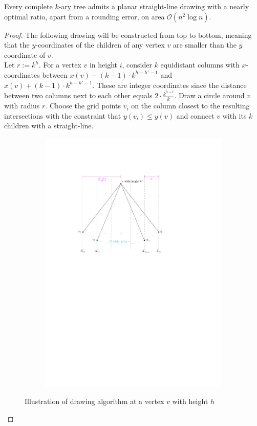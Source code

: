 
\begin{theorem}
	Every complete $k$-ary tree admits a planar straight-line drawing with a nearly optimal ratio, apart from a rounding error, on area $\mathcal{O}(n^2\log n)$.
\end{theorem}
\begin{proof}
	The following drawing will be constructed from top to bottom, meaning that the $y$-coordinates of the children of any vertex $v$ are smaller than the $y$ coordinate of $v$.\\
	Let $r := k^h$. For a vertex $v$ in height $i$, consider $k$ equidistant columns with $x$-coordinates between $x(v) - (k-1)\cdot  k^{h-h'-1}$ and $x(v) + (k-1)\cdot  k^{h-h'-1}$. These are integer coordinates since the distance between two columns next to each other equals $2\cdot \frac{k^{h-i}}{k}$. Draw a circle around $v$ with radius $r$. Choose the grid points $v_i$ on the column closest to the resulting intersections with the constraint that $y(v_i) \leq y(v)$ and connect $v$ with its $k$ children with a straight-line.
\begin{figure}[H]
	\centering
		\begin{subfigure}{\textwidth}
			\centering
			\includegraphics[page=1,width=0.6\linewidth]{graphics/k-ary_tree_algorithm_construction.pdf}
		\end{subfigure}
	\caption{Illustration of drawing algorithm at a vertex $v$ with height $h$}\label{im:k-ary_trees_algorithm_illustration}

\end{figure}
\end{proof}
